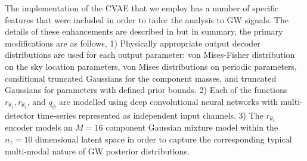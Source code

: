 \documentclass{article}
\begin{document}

%
%
The implementation of the \ac{CVAE} that we employ has a
number of specific features that were included in order to tailor the analysis to
\ac{GW} signals. The details of these enhancements are described in \cite{1909.06296} but in summary, the primary modifications are as follows, 1) Physically 
appropriate output decoder distributions are used for each output parameter: 
von Mises-Fisher distribution on the sky location parameters, von Mises 
distributions on periodic parameters, conditional truncated Gaussians for 
the component masses, and truncated Gaussians for
parameters with defined prior bounds. 2) Each of the
functions $r_{\theta_1},r_{\theta_2}$, and $q_{\phi}$ are modelled using deep
convolutional neural networks with multi-detector time-series represented as
independent input channels. 3) The $r_{\theta_1}$ encoder models an $M=16$ component
Gaussian mixture model within the $n_{z}=10$ dimensional latent space in order
to capture the corresponding typical multi-modal nature of \ac{GW} posterior
distributions.  
\end{document}
